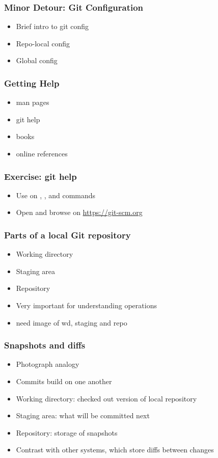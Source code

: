\documentclass{git_course}
\begin{document}
\begin{frame}
\frametitle{Minor Detour: Git Configuration}
\begin{itemize}
    \item Brief intro to git config
    \item Repo-local config
    \item Global config
\end{itemize}
\end{frame}

\begin{frame}
\frametitle{Getting Help}
\begin{itemize}
    \item man pages
    \item git help
    \item books
    \item online references
\end{itemize}
\end{frame}

\begin{frame}
\frametitle{Exercise: git help}
\begin{itemize}
    \item Use  on , ,  and
         commands
    \item Open and browse on \url{https://git-scm.org}
\end{itemize}
\end{frame}

\begin{frame}
\frametitle{Parts of a local Git repository}
\begin{itemize}
    \item Working directory
    \item Staging area
    \item Repository
    \item Very important for understanding operations
    \item need image of wd, staging and repo
\end{itemize}
\end{frame}

\begin{frame}
\frametitle{Snapshots and diffs}
\begin{itemize}
    \item Photograph analogy
    \item Commits build on one another
    \item Working directory: checked out version of local repository
    \item Staging area: what will be committed next
    \item Repository: storage of snapshots
    \item Contrast with other systems, which store diffs between changes
\end{itemize}
\end{frame}
\end{document}
